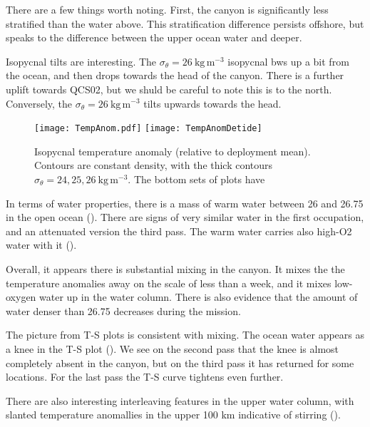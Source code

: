 \documentclass[11pt]{article}
\begin{document}
There are a few things worth noting. First, the canyon is significantly less stratified than the water above.  This stratification difference persists offshore, but speaks to the difference between the upper ocean water and deeper.  

Isopycnal tilts are interesting.  The $\sigma_{\theta}=26\ \mathrm{kg\,m^{-3}}$ isopycnal bws up a bit from the ocean, and then drops towards the head of the canyon.  There is a further uplift towards QCS02, but we shuld be careful to note this is to the north.  Conversely, the $\sigma_{\theta}=26\ \mathrm{kg\,m^{-3}}$ tilts upwards towards the head.  

 

\begin{figure*}[htbp]
  \begin{center}
    \texttt{[image: TempAnom.pdf]}
        \texttt{[image: TempAnomDetide]}
    \caption{Isopycnal temperature anomaly (relative to deployment mean).  Contours are constant density, with the thick contours $\sigma_{\theta} = 24, 25, 26\ \mathrm{kg\,m^{-3}}$. The bottom sets of plots have  
      \label{fig:TempAnom} }
  \end{center}
\end{figure*}

In terms of water properties, there is a mass of warm water between 26 and 26.75 in the open ocean ().  There are signs of very similar water in the first occupation, and an attenuated version the third pass.  The warm water carries  also high-O2 water with it ().  

Overall, it appears there is substantial mixing in the canyon. It mixes the the temperature anomalies away on the scale of less than a week, and it mixes low-oxygen water up in the water column. There is also evidence that the amount of water denser than 26.75 decreases during the mission.  

The picture from T-S plots is consistent with mixing.  The ocean water appears as a knee in the T-S plot ().  We see on the second pass that the knee is almost completely absent in the canyon, but on the third pass it has returned for some locations.  For the last pass the T-S curve tightens even further. 

There are also interesting interleaving features in the upper water column, with slanted temperature anomallies in the upper 100 km indicative of stirring ().   
\end{document}
